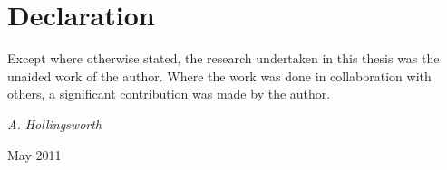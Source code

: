 \chapter*{Declaration}

\normalsize
Except where otherwise stated, the research undertaken in this thesis
was the unaided work of the author. Where the work was done in collaboration
with others, a significant contribution was made by the author.


\vspace{20mm}
\hfill {\it A. Hollingsworth}

\hfill May 2011


